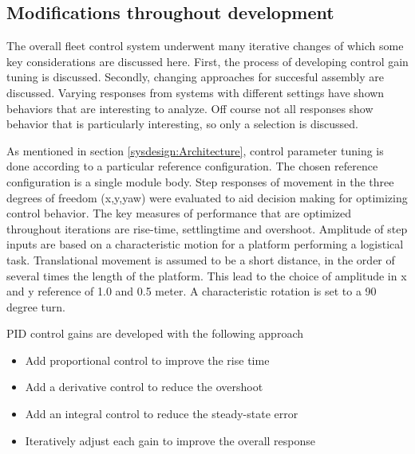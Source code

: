 \subsection{Modifications throughout development}
\label{AdjustmentsAfterTests}
The overall fleet control system underwent many iterative changes of which some key considerations are discussed here. First, the process of developing control gain tuning is discussed. Secondly, changing approaches for succesful assembly are discussed. Varying responses from systems with different settings have shown behaviors that are interesting to analyze. Off course not all responses show behavior that is particularly interesting, so only a selection is discussed.

As mentioned in section \ref{sysdesign:Architecture}, control parameter tuning is done according to a particular reference configuration. The chosen reference configuration is a single module body. Step responses of movement in the three degrees of freedom (x,y,yaw) were evaluated to aid decision making for optimizing control behavior. The key measures of performance that are optimized throughout iterations are rise-time, settlingtime and overshoot. Amplitude of step inputs are based on a characteristic motion for a platform performing a logistical task. Translational movement is assumed to be a short distance, in the order of several times the length of the platform. This lead to the choice of amplitude in x and y reference of 1.0 and 0.5 meter. A characteristic rotation is set to a 90 degree turn. 

PID control gains are developed with the following approach \cite{PIDIntroMIT}
\begin{itemize}
	\item Add proportional control to improve the rise time
	\item Add a derivative control to reduce the overshoot
	\item Add an integral control to reduce the steady-state error
	\item Iteratively adjust each gain to improve the overall response 
\end{itemize}


